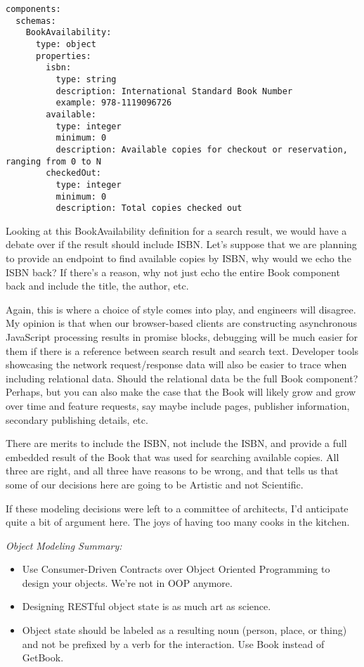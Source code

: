 \begin{minipage}{\linewidth}
\begin{code}
\begin{lstlisting}[belowskip=-\baselineskip]
components:
  schemas:
    BookAvailability:
      type: object
      properties:
        isbn:
          type: string
          description: International Standard Book Number
          example: 978-1119096726
        available:
          type: integer
          minimum: 0
          description: Available copies for checkout or reservation, ranging from 0 to N
        checkedOut:
          type: integer
          minimum: 0
          description: Total copies checked out
\end{lstlisting}
\end{code}
\end{minipage}

Looking at this BookAvailability definition for a search result, we would have a debate over if the result should include ISBN.  Let's suppose that we are planning to provide an endpoint to find available copies by ISBN, why would we echo the ISBN back?  If there's a reason, why not just echo the entire Book component back and include the title, the author, etc.

Again, this is where a choice of style comes into play, and engineers will disagree.  My opinion is that when our browser-based clients are constructing asynchronous JavaScript processing results in promise blocks, debugging will be much easier for them if there is a reference between search result and search text.  Developer tools showcasing the network request/response data will also be easier to trace when including relational data.  Should the relational data be the full Book component?  Perhaps, but you can also make the case that the Book will likely grow and grow over time and feature requests, say maybe include pages, publisher information, secondary publishing details, etc.

There are merits to include the ISBN, not include the ISBN, and provide a full embedded result of the Book that was used for searching available copies.  All three are right, and all three have reasons to be wrong, and that tells us that some of our decisions here are going to be Artistic and not Scientific.

If these modeling decisions were left to a committee of architects, I'd anticipate quite a bit of argument here.  The joys of having too many cooks in the kitchen.

\emph{Object Modeling Summary:}

\begin{itemize}
  \item Use Consumer-Driven Contracts over Object Oriented Programming to design your objects.  We're not in OOP anymore.
  \item Designing RESTful object state is as much art as science.
  \item Object state should be labeled as a resulting noun (person, place, or thing) and not be prefixed by a verb for the interaction.  Use Book instead of GetBook.
\end{itemize}
